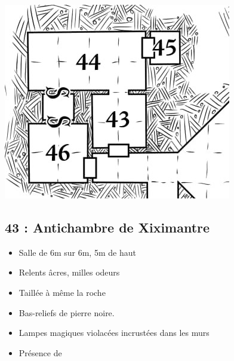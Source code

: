 \vfill\pagebreak
\includegraphics[width=\columnwidth]{pics/map_43-46.jpg}

\subsection{43 : Antichambre de Xiximantre}\label{n3:s43}
\begin{itemize}
  \item Salle de 6m sur 6m, 5m de haut
  \item Relents âcres, milles odeurs
  \item Taillée à même la roche
  \item Bas-reliefs de pierre noire.
  \item Lampes magiques violacées incrustées dans les murs
  \item Présence de  \textbf{}
\end{itemize}

